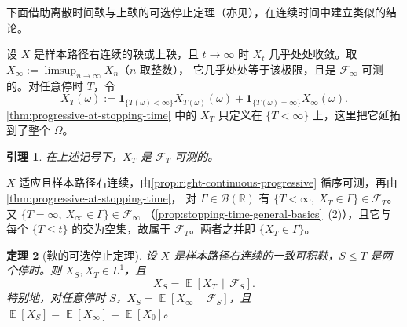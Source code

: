 \documentclass[UTF8,11pt,a4paper,oneside,fontset=fandol]{ctexrep}
\makeatletter
\numberwithin{equation}{section}
\theoremstyle{zhthm}
\newtheorem{theorem}{定理}[section]
\newtheorem{lemma}[theorem]{引理}
\renewenvironment{proof}[1][\proofname]{\par
  \pushQED{\qed}%
  \normalfont\topsep6\p@\@plus6\p@\relax
  \trivlist
  \item[\hskip\labelsep\bfseries#1\hspace{0.5em}]\ignorespaces
}{%
  \popQED\endtrivlist\@endpefalse
}
\renewcommand{\proofname}{证明}
\newcommand{\R}{\mathbb{R}}
\newcommand{\B}{\mathcal{B}}
\newcommand{\F}{\mathcal{F}}
\DeclareMathOperator{\E}{\mathbb{E}}
\newcommand{\ind}[1]{\mathbf{1}_{#1}}
\newcommand{\Econd}[2]{%
  \E\!\left[#1\,\middle|\,#2\right]}
\makeatother
\begin{document}
下面借助离散时间鞅与上鞅的可选停止定理\cite[附录 A2]{LeGall2016}（亦见\cite[\S4.8]{Durrett2019}），在连续时间中建立类似的结论。

设 $X$ 是样本路径右连续的鞅或上鞅，且 $t\to\infty$ 时 $X_t$ 几乎处处收敛。取 $X_\infty:=\limsup_{n\to\infty}X_n$（$n$ 取整数），
它几乎处处等于该极限，且是 $\F_\infty$ 可测的。对任意停时 $T$，令
\[
  X_T(\omega):=\ind{\{T(\omega)<\infty\}}X_{T(\omega)}(\omega)+\ind{\{T(\omega)=\infty\}}X_\infty(\omega).
\]
\cref{thm:progressive-at-stopping-time} 中的 $X_T$ 只定义在 $\{T<\infty\}$ 上，这里把它延拓到了整个 $\Omega$。

\begin{lemma}
\label{lem:stopped-value-measurable}
在上述记号下，$X_T$ 是 $\F_T$ 可测的。
\end{lemma}

\begin{proof}
$X$ 适应且样本路径右连续，由\cref{prop:right-continuous-progressive} 循序可测，再由\cref{thm:progressive-at-stopping-time}，
对 $\Gamma\in\B(\R)$ 有 $\{T<\infty,\ X_T\in\Gamma\}\in\F_T$。又 $\{T=\infty,\ X_\infty\in\Gamma\}\in\F_\infty$
（\cref{prop:stopping-time-general-basics}~(2)），且它与每个 $\{T\le t\}$ 的交为空集，故属于 $\F_T$。两者之并即 $\{X_T\in\Gamma\}$。
\end{proof}

\begin{theorem}[鞅的可选停止定理]
\label{thm:optional-stopping-martingale}
设 $X$ 是样本路径右连续的一致可积鞅，$S\le T$ 是两个停时。则 $X_S,X_T\in L^1$，且
\[
  X_S=\Econd{X_T}{\F_S}.
\]
特别地，对任意停时 $S$，$X_S=\Econd{X_\infty}{\F_S}$，且 $\E[X_S]=\E[X_\infty]=\E[X_0]$。
\end{theorem}
\end{document}
